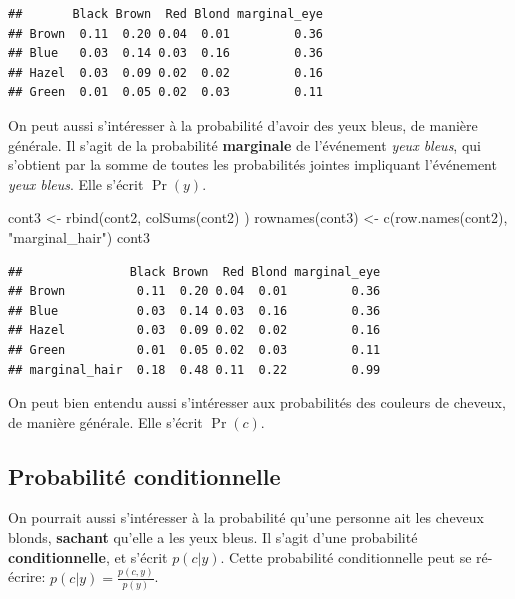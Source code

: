 \documentclass[
  a4paper,11pt,twoside,onecolumn,openright,final,oldfontcommands]{memoir}
\newenvironment{Shaded}{\begin{snugshade}}{\end{snugshade}}
\newcommand{\FunctionTok}[1]{\textcolor[rgb]{0.00,0.00,0.00}{#1}}
\newcommand{\NormalTok}[1]{#1}
\newcommand{\OtherTok}[1]{\textcolor[rgb]{0.56,0.35,0.01}{#1}}
\newcommand{\StringTok}[1]{\textcolor[rgb]{0.31,0.60,0.02}{#1}}
\theoremstyle{definition}
\theoremstyle{definition}
\theoremstyle{definition}
\theoremstyle{definition}
\theoremstyle{remark}
\begin{document}
\begin{verbatim}
##       Black Brown  Red Blond marginal_eye
## Brown  0.11  0.20 0.04  0.01         0.36
## Blue   0.03  0.14 0.03  0.16         0.36
## Hazel  0.03  0.09 0.02  0.02         0.16
## Green  0.01  0.05 0.02  0.03         0.11
\end{verbatim}

On peut aussi s'intéresser à la probabilité d'avoir des yeux bleus, de manière générale. Il s'agit de la probabilité \textbf{marginale} de l'événement \emph{yeux bleus}, qui s'obtient par la somme de toutes les probabilités jointes impliquant l'événement \emph{yeux bleus}. Elle s'écrit \(\Pr(y)\).

\begin{Shaded}
\begin{Highlighting}[]
\NormalTok{cont3 }\OtherTok{\textless{}{-}} \FunctionTok{rbind}\NormalTok{(cont2, }\FunctionTok{colSums}\NormalTok{(cont2) )}
\FunctionTok{rownames}\NormalTok{(cont3) }\OtherTok{\textless{}{-}} \FunctionTok{c}\NormalTok{(}\FunctionTok{row.names}\NormalTok{(cont2), }\StringTok{"marginal\_hair"}\NormalTok{)}
\NormalTok{cont3}
\end{Highlighting}
\end{Shaded}

\begin{verbatim}
##               Black Brown  Red Blond marginal_eye
## Brown          0.11  0.20 0.04  0.01         0.36
## Blue           0.03  0.14 0.03  0.16         0.36
## Hazel          0.03  0.09 0.02  0.02         0.16
## Green          0.01  0.05 0.02  0.03         0.11
## marginal_hair  0.18  0.48 0.11  0.22         0.99
\end{verbatim}

On peut bien entendu aussi s'intéresser aux probabilités des couleurs de cheveux, de manière générale. Elle s'écrit \(\Pr(c)\).

\hypertarget{probabilituxe9-conditionnelle}{%
\subsection{Probabilité conditionnelle}\label{probabilituxe9-conditionnelle}}

On pourrait aussi s'intéresser à la probabilité qu'une personne ait les cheveux blonds, \textbf{sachant} qu'elle a les yeux bleus. Il s'agit d'une probabilité \textbf{conditionnelle}, et s'écrit \(p(c|y)\). Cette probabilité conditionnelle peut se ré-écrire: \(p(c|y)= \frac{p(c,y)}{p(y)}\).
\end{document}
